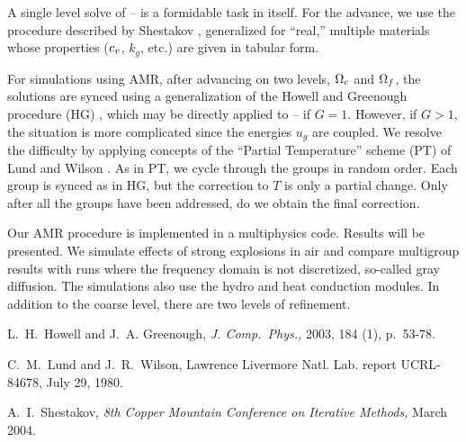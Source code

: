\documentclass{report}
\begin{document}
A single level solve of --
is a formidable task in itself. For the advance,
we use the procedure described
by Shestakov \cite{She}, generalized for ``real,''
multiple materials whose properties ($c_v$, $k_g$, etc.) are
given in tabular form.

For simulations using AMR,
after advancing on two levels, $\Omega_c$ and $\Omega_f$, the
solutions are synced using a generalization of the
Howell and Greenough procedure (HG) \cite{HowGre},
which may be directly applied to --
if $G = 1$. However, if $G > 1$, the situation is
more complicated since the energies $u_g$
are coupled. We
resolve the difficulty by applying concepts of the ``Partial
Temperature'' scheme (PT) of Lund and Wilson \cite{LunWil}.
As in PT, we cycle through the groups in random order.
Each group is synced as in HG, but the correction to
$T$ is only a partial change. Only after all the groups
have been addressed, do we obtain the final correction.

Our AMR procedure is implemented in a multiphysics code. Results
will be presented. We simulate effects of strong
explosions in air and compare multigroup results
with runs where the frequency domain is not
discretized, so-called gray diffusion. The simulations
also use the hydro and heat conduction modules. In addition
to the coarse level, there are two levels of refinement.

\begin{thebibliography}{99}

L.\ H.\ Howell and J.\ A. Greenough,
{\em J. Comp.\ Phys.,} 2003, 184 (1), p.\ 53-78.

C.\ M.\ Lund and J.\ R.\ Wilson,
Lawrence Livermore Natl. Lab. report UCRL-84678, July 29, 1980.

A.\ I.\ Shestakov, {\em
8th Copper Mountain Conference
on Iterative Methods,}
March 2004.


\end{thebibliography}
\end{document}
